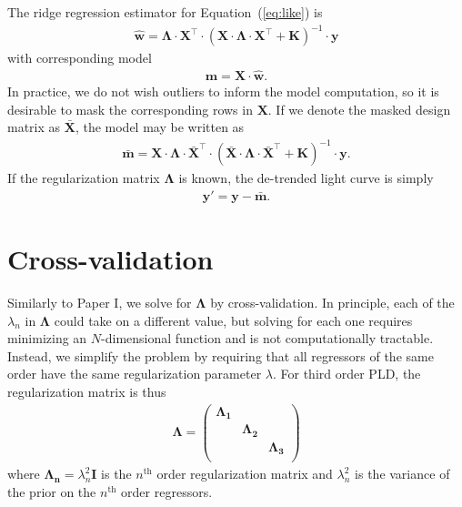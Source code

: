 \documentclass[]{emulateapj}
\begin{document}
The ridge regression estimator for Equation~(\ref{eq:like}) is
%
\begin{align}
\label{eq:estimator}
\mathbf{\hat{w}} = \mathbf{\Lambda} \cdot \mathbf{X}^\top
                   \cdot
                   \left(
                   \mathbf{X} \cdot \mathbf{\Lambda} \cdot \mathbf{X}^\top + \mathbf{K}
                   \right)^{-1} 
                   \cdot
                   \mathbf{y}
\end{align}
%
with corresponding model
%
\begin{align}
\label{eq:model}
\mathbf{m} = \mathbf{X} \cdot \mathbf{\hat{w}}.
\end{align}
%
In practice, we do not wish outliers to inform the model computation, so it is
desirable to mask the corresponding rows in $\mathbf{X}$. If we denote the masked
design matrix as $\mathbf{\bar{X}}$, the model may be written as
%
\begin{align}
\label{eq:model_masked}
\mathbf{\bar{m}} = \mathbf{X} \cdot \mathbf{\Lambda} \cdot \mathbf{\bar{X}}^\top
                   \cdot
                   \left(
                   \mathbf{\bar{X}} \cdot \mathbf{\Lambda} \cdot \mathbf{\bar{X}}^\top + \mathbf{K}
                   \right)^{-1} 
                   \cdot
                   \mathbf{y}.
\end{align}
%
If the regularization matrix $\mathbf{\Lambda}$ is known, the de-trended light curve
is simply
\begin{align}
\label{eq:detrended}
\mathbf{y}' = \mathbf{y} - \mathbf{\bar{m}}.
\end{align}

\section{Cross-validation}
Similarly to Paper I, we solve for $\mathbf{\Lambda}$ by cross-validation. 
In principle, each of the $\lambda_n$ in $\mathbf{\Lambda}$ could take on a different value, but solving for each one
requires minimizing an $N$-dimensional function and is not computationally tractable.
Instead, we simplify the problem by requiring that all regressors of the same order have the
same regularization parameter $\lambda$. For third order PLD, the regularization matrix is thus
%
\begin{align}
\label{eq:Lambda}
\mathbf{\Lambda} = 
\left(
\begin{array}{ccc}
  \mathbf{\Lambda_1}      &                       & \\
  &                       \mathbf{\Lambda_2}      & \\
  &                       &                       \mathbf{\Lambda_3} \\
\end{array}
\right)
\end{align}
%
where $\mathbf{\Lambda_n} = \lambda_{n}^2\mathbf{I}$ is the 
$n^\mathrm{th}$ order regularization matrix and $\lambda_{n}^2$ is the variance
of the prior on the $n^\mathrm{th}$ order regressors. 
\end{document}
